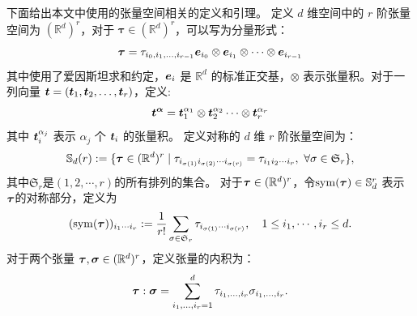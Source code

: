 下面给出本文中使用的张量空间相关的定义和引理。
定义 $d$ 维空间中的 $r$ 阶张量空间为 $(\mathbb{R}^d)^{ r}$，对于 
$\boldsymbol{\tau} \in (\mathbb{R}^d)^{ r}$，可以写为分量形式：
$$
\boldsymbol{\tau} = \tau_{i_0, i_1, \ldots,
i_{r-1}}\boldsymbol{e}_{i_0}\otimes\boldsymbol{e}_{i_1}\otimes\cdots\otimes\boldsymbol{e}_{i_{r-1}}
$$
其中使用了爱因斯坦求和约定，$\boldsymbol{e}_i$ 是 $\mathbb{R}^d$ 的标准正交基，$\otimes$
表示张量积。对于一列向量 $\boldsymbol{t} = (\boldsymbol{t}_1, \boldsymbol{t}_2, \ldots, \boldsymbol{t}_r)$，定义:
$$
\boldsymbol{t}^{\boldsymbol{\alpha}} =
\boldsymbol{t}_1^{\alpha_1}\otimes\boldsymbol{t}_2^{\alpha_2}\cdots\otimes\boldsymbol{t}_r^{\alpha_r}
$$
其中 $\boldsymbol{t}_i^{\alpha_j}$ 表示 $\alpha_j$ 个 $\boldsymbol{t}_i$ 的张量积。
定义对称的 $d$ 维 $r$ 阶张量空间为：
$$
\mathbb{S}_{d}(r):=\{\btau\in(\mathbb{R}^d)^{ r} \mid 
\tau_{i_{\sigma(1)}i_{\sigma(2)}\cdots i_{\sigma(r)}}=\tau_{i_1i_2\cdots i_r}, \ 
\forall \sigma\in\mathfrak{S}_{r}\},
$$
其中$\mathfrak{S}_{r}$是$(1, 2, \cdots, r)$的所有排列的集合。
对于$\boldsymbol{\tau} \in (\mathbb{R}^d)^r$，令$\operatorname{sym}(\boldsymbol{\tau}) \in \mathbb{S}_d^{r}$ 表示 
$\boldsymbol{\tau}$的对称部分，定义为
$$
(\operatorname{sym}(\boldsymbol{\tau}))_{i_1\cdots
i_r}:=\frac{1}{r!}\sum\limits_{\sigma\in\mathfrak{S}_{r}}\tau_{i_{\sigma(1)}\cdots
i_{\sigma(r)}} 
, \quad 1\leq i_1,\cdots, i_r \leq d.
$$
对于两个张量 $\boldsymbol{\tau}, \boldsymbol{\sigma} \in (\mathbb{R}^d)^r$，定义张量的内积为：
$$
\boldsymbol{\tau} : \boldsymbol{\sigma} = \sum_{i_1, \ldots, i_r = 1}^d \tau_{i_1, \ldots, i_r}
\sigma_{i_1, \ldots, i_r}.
$$

